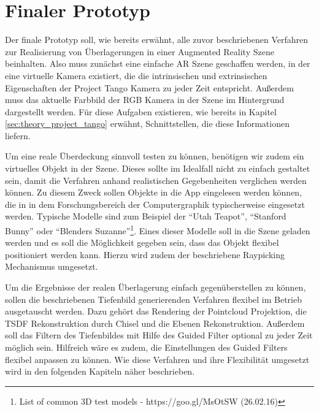 \section{Finaler Prototyp} \label{sec:final_prototype}

Der finale Prototyp soll, wie bereits erwähnt, alle zuvor beschriebenen Verfahren zur Realisierung von Überlagerungen in einer Augmented Reality Szene beinhalten. Also muss zunächst eine einfache AR Szene geschaffen werden, in der eine virtuelle Kamera existiert, die die intrinsischen und extrinsischen Eigenschaften der Project Tango Kamera zu jeder Zeit entspricht. Außerdem muss das aktuelle Farbbild der RGB Kamera in der Szene im Hintergrund dargestellt werden. Für diese Aufgaben existieren, wie bereits in Kapitel \ref{sec:theory_project_tango} erwähnt, Schnittstellen, die diese Informationen liefern. 

Um eine reale Überdeckung sinnvoll testen zu können, benötigen wir zudem ein virtuelles Objekt in der Szene. Dieses sollte im Idealfall nicht zu einfach gestaltet sein, damit die Verfahren anhand realistischen Gegebenheiten verglichen werden können. Zu diesem Zweck sollen Objekte in die App eingelesen werden können, die in in dem Forschungsbereich der Computergraphik typischerweise eingesetzt werden. Typische Modelle sind zum Beispiel der \enquote{Utah Teapot}, \enquote{Stanford Bunny} oder \enquote{Blenders Suzanne}\footnote{List of common 3D test models - https://goo.gl/MsOtSW (26.02.16)}.  Eines dieser Modelle soll in die Szene geladen werden und es soll die Möglichkeit gegeben sein, dass das Objekt flexibel positioniert werden kann. Hierzu wird zudem der beschriebene Raypicking Mechanismus umgesetzt.

Um die Ergebnisse der  realen Überlagerung einfach gegenüberstellen zu können, sollen die beschriebenen Tiefenbild generierenden Verfahren flexibel im Betrieb ausgetauscht werden. Dazu gehört das Rendering der Pointcloud Projektion, die TSDF Rekonstruktion durch Chisel und die Ebenen Rekonstruktion. Außerdem soll das Filtern des Tiefenbildes mit Hilfe des Guided Filter optional zu jeder Zeit möglich sein. Hilfreich wäre es zudem, die Einstellungen des Guided Filters flexibel anpassen zu können. Wie diese Verfahren und ihre Flexibilität umgesetzt wird in den folgenden Kapiteln näher beschrieben.